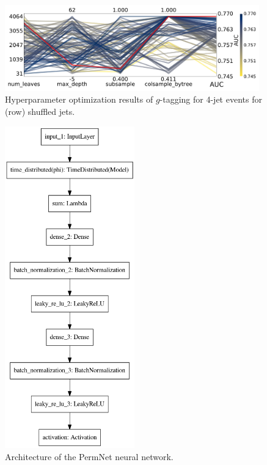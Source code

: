 \begin{figure}[h!]
  \includegraphics[width=0.98\textwidth, trim=0 0 0 0, clip]{figures/quarks/CV_viz-njet=4-name=lf_gtag_shuffled_lgb_down_sample=1.00-ML_vars=vertex-selection=b-ejet_min=4-n_iter_RS_lgb=99-n_iter_RS_xgb=9-cdot_cut=0.90-version=19.pdf}
  \caption[Parallel Plot of HPO Results for 4-Jet $g$-Tagging for Shuffled Jets]
          {Hyperparameter optimization results of $g$-tagging for 4-jet events for (row) shuffled jets. 
          } 
  \label{fig:q:CV_res_parallel_coords_g_tag_4j_shuffled}
\end{figure}

\newpage
\FloatBarrier



\begin{figure}
  \centerfloat
  \includegraphics[width=0.5\textwidth]{figures/quarks/TensorFlow_model.png}
  \caption[PermNet Architecture]
          {Architecture of the PermNet neural network. 
          } 
  \label{fig:q:permnet_architecture}
\end{figure}


